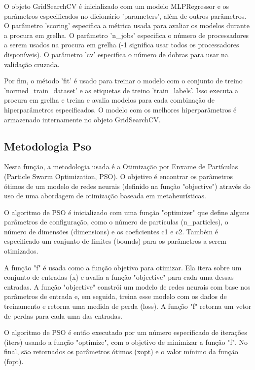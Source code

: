 \documentclass[10pt]{article}
\begin{document}
O objeto GridSearchCV é inicializado com um modelo 
MLPRegressor e os parâmetros especificados no dicionário 'parameters', 
além de outros parâmetros. O parâmetro 'scoring' especifica a métrica usada 
para avaliar os modelos durante a procura em grelha. O parâmetro 'n\_jobs' 
especifica o número de processadores a serem usados na procura em 
grelha (-1 significa usar todos os processadores disponíveis). 
O parâmetro 'cv' especifica o número de dobras para usar na validação cruzada.

Por fim, o método 'fit' é usado para treinar o modelo com o conjunto de 
treino 'normed\_train\_dataset' e as etiquetas de treino 'train\_labels'. Isso 
executa a procura em grelha e treina e avalia modelos para cada combinação de 
hiperparâmetros especificados. O modelo com os melhores hiperparâmetros é 
armazenado internamente no objeto GridSearchCV.

\newpage

\subsection{Metodologia Pso}
Nesta função, a metodologia usada é a Otimização por Enxame de Partículas 
(Particle Swarm Optimization, PSO). O objetivo é encontrar os parâmetros 
ótimos de um modelo de redes neurais (definido na função "objective") através 
do uso de uma abordagem de otimização baseada em metaheurísticas.

O algoritmo de PSO é inicializado com uma função "optimizer" que define 
alguns parâmetros de configuração, como o número de partículas (n\_particles),
o número de dimensões (dimensions) e os coeficientes c1 e c2. Também é 
especificado um conjunto de limites (bounds) para os parâmetros a serem 
otimizados.

A função "f" é usada como a função objetivo para otimizar. Ela itera sobre um 
conjunto de entradas (x) e avalia a função "objective" para cada uma dessas 
entradas. A função "objective" constrói um modelo de redes neurais com base 
nos parâmetros de entrada e, em seguida, treina esse modelo com os dados de 
treinamento e retorna uma medida de perda (loss). A função "f" retorna um 
vetor de perdas para cada uma das entradas.

O algoritmo de PSO é então executado por um número especificado de 
iterações (iters) usando a função "optimize", com o objetivo de minimizar a 
função "f". No final, são retornados os parâmetros ótimos (xopt) e o valor 
mínimo da função (fopt).
\end{document}
